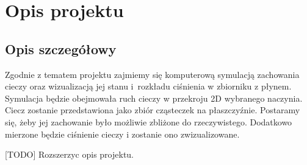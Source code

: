 \documentclass[a4paper]{article}
\begin{document}

\section{Opis projektu}
\subsection{Opis szczegółowy}
Zgodnie z tematem projektu zajmiemy się komputerową symulacją zachowania cieczy oraz wizualizacją jej stanu i~rozkładu ciśnienia w zbiorniku z płynem.
Symulacja będzie obejmowała ruch cieczy w przekroju 2D wybranego naczynia. Ciecz zostanie przedstawiona jako zbiór cząsteczek na płaszczyźnie. Postaramy się, żeby jej zachowanie było możliwie zbliżone do rzeczywistego.
Dodatkowo mierzone będzie ciśnienie cieczy i zostanie ono zwizualizowane.

[TODO] Rozszerzyc opis projektu.
\end{document}
